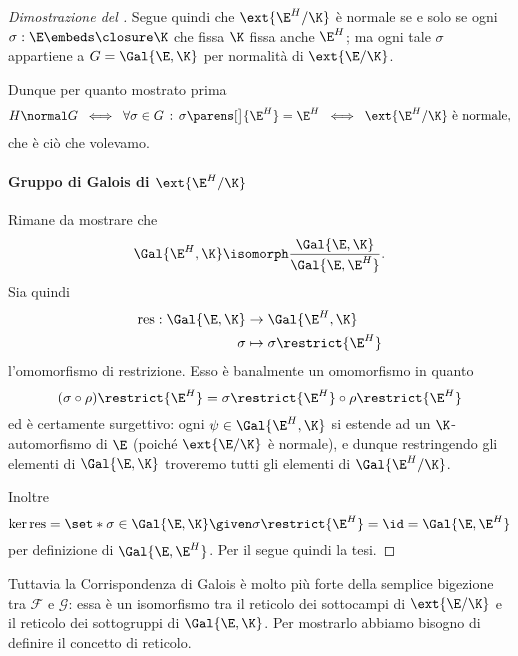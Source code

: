 \begin{proof}[Dimostrazione del ]
    Segue quindi che $\ext{\E^H / \K}$ è normale se e solo se ogni $\sigma : \E \embeds \closure\K$ che fissa $\K$ fissa anche $\E^H$; ma ogni tale $\sigma$ appartiene a $G = \Gal{\E, \K}$ per normalità di $\ext{\E / \K}$.
    
    Dunque per quanto mostrato prima \[
        H \normal G \;\iff\; {\forall \sigma \in G\,:\, \sigma\parens[\big]{\E^H} = \E^H} \;\iff \; \ext{\E^H / \K} \text{ è normale},
    \] che è ciò che volevamo.

    \paragraph{Gruppo di Galois di $\ext{\E^H / \K}$}
    Rimane da mostrare che \[
        \Gal{\E^H, \K} \isomorph \frac{\Gal{\E, \K}}{\Gal{\E, \E^H}}.
    \] Sia quindi \begin{align*}
        \operatorname{res} : \Gal{\E, \K} &\to \Gal{\E^H, \K}\\
        \sigma &\mapsto \sigma\restrict{\E^H}
    \end{align*} l'omomorfismo di restrizione. Esso è banalmente un omomorfismo in quanto \[
        (\sigma \circ \rho)\restrict{\E^H} = \sigma\restrict{\E^H} \circ \rho\restrict{\E^H}
    \] ed è certamente surgettivo: ogni $\psi \in \Gal{\E^H, \K}$ si estende ad un $\K$-automorfismo di $\E$ (poiché $\ext{\E / \K}$ è normale), e dunque restringendo gli elementi di $\Gal{\E, \K}$ troveremo tutti gli elementi di $\Gal{\E^H / \K}$.
    
    Inoltre \[
        \ker \operatorname{res} = \set*{\sigma \in \Gal{\E, \K} \given \sigma\restrict{\E^H} = \id} = \Gal{\E, \E^H}
    \] per definizione di $\Gal{\E, \E^H}$. Per il  segue quindi la tesi.
\end{proof}

Tuttavia la Corrispondenza di Galois è molto più forte della semplice bigezione tra $\mathscr{F}$ e $\mathscr{G}$: essa è un isomorfismo tra il reticolo dei sottocampi di $\ext{\E / \K}$ e il reticolo dei sottogruppi di $\Gal{\E, \K}$.
Per mostrarlo abbiamo bisogno di definire il concetto di reticolo.

